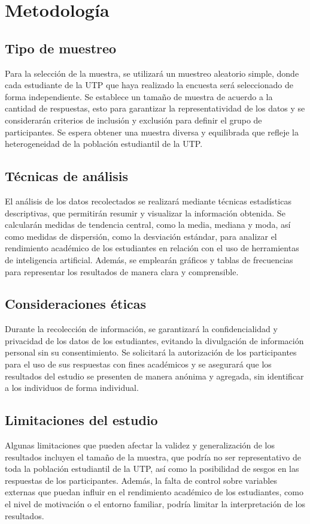 \section{Metodología}

  \subsection{Tipo de muestreo}

  Para la selección de la muestra, se utilizará un muestreo aleatorio simple, donde cada estudiante de la UTP que haya realizado la encuesta será seleccionado de forma independiente. Se establece un tamaño de muestra de acuerdo a la cantidad de respuestas, esto para garantizar la representatividad de los datos y se considerarán criterios de inclusión y exclusión para definir el grupo de participantes. Se espera obtener una muestra diversa y equilibrada que refleje la heterogeneidad de la población estudiantil de la UTP.

  \subsection{Técnicas de análisis}

  El análisis de los datos recolectados se realizará mediante técnicas estadísticas descriptivas, que permitirán resumir y visualizar la información obtenida. Se calcularán medidas de tendencia central, como la media, mediana y moda, así como medidas de dispersión, como la desviación estándar, para analizar el rendimiento académico de los estudiantes en relación con el uso de herramientas de inteligencia artificial. Además, se emplearán gráficos y tablas de frecuencias para representar los resultados de manera clara y comprensible.

  \subsection{Consideraciones éticas}

  Durante la recolección de información, se garantizará la confidencialidad y privacidad de los datos de los estudiantes, evitando la divulgación de información personal sin su consentimiento. Se solicitará la autorización de los participantes para el uso de sus respuestas con fines académicos y se asegurará que los resultados del estudio se presenten de manera anónima y agregada, sin identificar a los individuos de forma individual.

  \subsection{Limitaciones del estudio}

  Algunas limitaciones que pueden afectar la validez y generalización de los resultados incluyen el tamaño de la muestra, que podría no ser representativo de toda la población estudiantil de la UTP, así como la posibilidad de sesgos en las respuestas de los participantes. Además, la falta de control sobre variables externas que puedan influir en el rendimiento académico de los estudiantes, como el nivel de motivación o el entorno familiar, podría limitar la interpretación de los resultados.